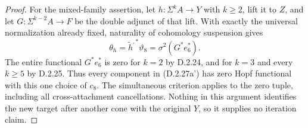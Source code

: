 \begin{proof}
For the mixed-family assertion, let $h:\Sigma^kA\to Y$
with $k\ge2$, lift it to $Z$, and let
$G:\Sigma^{k-2}A\to F$ be the double adjunct of that lift.
With exactly the universal normalization already fixed,
naturality of cohomology suspension gives
\[
 \theta_h=\widetilde h^{,*}\vartheta_8
       =\sigma^2(G^*e_6^*).
 \tag{D.2.27m}
\]
The entire functional $G^*e_6^*$ is zero for $k=2$ by
\textup{D.2.24}, and for $k=3$ and every $k\ge5$ by
\textup{D.2.25}. Thus every component in
\textup{(D.2.27a')} has zero Hopf functional with this one
choice of $c_8$. The simultaneous criterion applies to the
zero tuple, including all cross-attachment cancellations.
Nothing in this argument
identifies the new target after another cone with the
original $Y$, so it supplies no iteration claim.
\end{proof}
